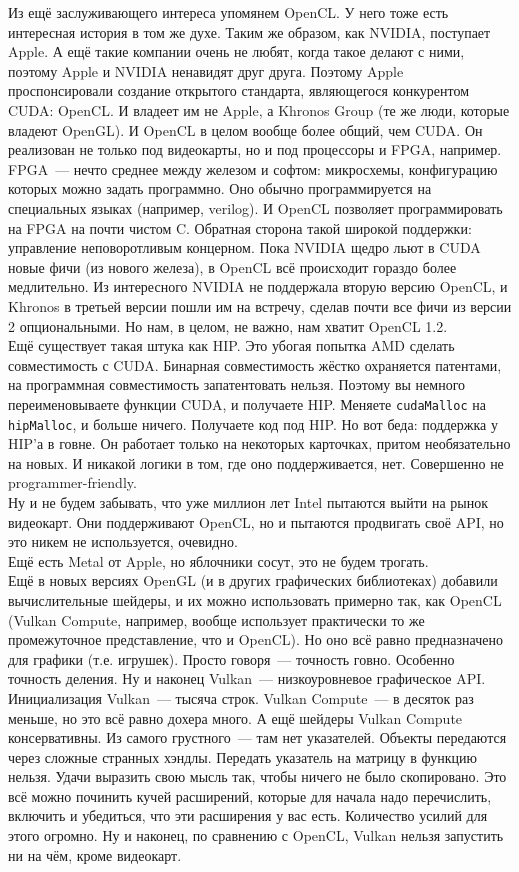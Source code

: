 \documentclass{article}
\begin{document}
    Из ещё заслуживающего интереса упомянем OpenCL. У него тоже есть интересная история в том же духе. Таким же образом, как NVIDIA, поступает Apple. А ещё такие компании очень не любят, когда такое делают с ними, поэтому Apple и NVIDIA ненавидят друг друга. Поэтому Apple проспонсировали создание открытого стандарта, являющегося конкурентом CUDA: OpenCL. И владеет им не Apple, а Khronos Group (те же люди, которые владеют OpenGL). И OpenCL в целом вообще более общий, чем CUDA. Он реализован не только под видеокарты, но и под процессоры и FPGA, например. FPGA~--- нечто среднее между железом и софтом: микросхемы, конфигурацию которых можно задать программно. Оно обычно программируется на специальных языках (например, verilog). И OpenCL позволяет программировать на FPGA на почти чистом C. Обратная сторона такой широкой поддержки: управление неповоротливым концерном. Пока NVIDIA щедро льют в CUDA новые фичи (из нового железа), в OpenCL всё происходит гораздо более медлительно. Из интересного NVIDIA не поддержала вторую версию OpenCL, и Khronos в третьей версии пошли им на встречу, сделав почти все фичи из версии 2 опциональными. Но нам, в целом, не важно, нам хватит OpenCL 1.2.\\
    Ещё существует такая штука как HIP. Это убогая попытка AMD сделать совместимость с CUDA. Бинарная совместимость жёстко охраняется патентами, на программная совместимость запатентовать нельзя. Поэтому вы немного переименовываете функции CUDA, и получаете HIP. Меняете \Verb|cudaMalloc| на \Verb|hipMalloc|, и больше ничего. Получаете код под HIP. Но вот беда: поддержка у HIP'а в говне. Он работает только на некоторых карточках, притом необязательно на новых. И никакой логики в том, где оно поддерживается, нет. Совершенно не programmer-friendly.\\
    Ну и не будем забывать, что уже миллион лет Intel пытаются выйти на рынок видеокарт. Они поддерживают OpenCL, но и пытаются продвигать своё API, но это никем не используется, очевидно.\\
    Ещё есть Metal от Apple, но яблочники сосут, это не будем трогать.\\
    Ещё в новых версиях OpenGL (и в других графических библиотеках) добавили вычислительные шейдеры, и их можно использовать примерно так, как OpenCL (Vulkan Compute, например, вообще использует практически то же промежуточное представление, что и OpenCL). Но оно всё равно предназначено для графики (т.е. игрушек). Просто говоря~--- точность говно. Особенно точность деления. Ну и наконец Vulkan~--- низкоуровневое графическое API. Инициализация Vulkan~--- тысяча строк. Vulkan Compute~--- в десяток раз меньше, но это всё равно дохера много. А ещё шейдеры Vulkan Compute консервативны. Из самого грустного~--- там нет указателей. Объекты передаются через сложные странных хэндлы. Передать указатель на матрицу в функцию нельзя. Удачи выразить свою мысль так, чтобы ничего не было скопировано. Это всё можно починить кучей расширений, которые для начала надо перечислить, включить и убедиться, что эти расширения у вас есть. Количество усилий для этого огромно. Ну и наконец, по сравнению с OpenCL, Vulkan нельзя запустить ни на чём, кроме видеокарт.\\
\end{document}
